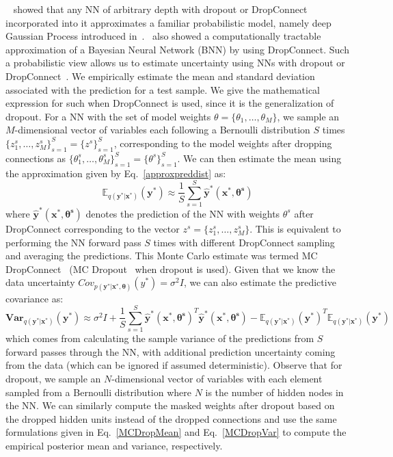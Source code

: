     ~\cite{DropoutUQ} showed that any NN of arbitrary depth with dropout or DropConnect incorporated into it approximates a familiar probabilistic model, namely deep Gaussian Process introduced in~\cite{DeepGP}.~\cite{DropConnectUQ} also showed a computationally tractable approximation of
    a Bayesian Neural Network (BNN) by using DropConnect. Such a probabilistic view allows us to estimate uncertainty using NNs with dropout or DropConnect~\cite{DropoutUQ, DropConnectUQ}. We empirically estimate the mean and standard deviation associated with the prediction for a test sample. We give the mathematical expression for such when DropConnect is used, since it is the generalization of dropout. For a NN with the set of model weights $\theta = \{\theta_1, \ldots, \theta_M\}$, we sample an $M$-dimensional vector of variables each following a Bernoulli distribution $S$ times $\{z^s_1, \ldots, z^s_M\}_{s=1}^S = \{z^s\}_{s=1}^S$, corresponding to the model weights after dropping connections as $\{\theta^s_1, \ldots, \theta^s_M\}_{s=1}^S = \{\theta^s\}_{s=1}^S$. We can then estimate the mean using the approximation given by Eq.~\ref{approxpreddist} as:
    \begin{equation}\label{MCDropMean}
        \mathbb{E}_{q(\mathbf{y^*|x^*})}(\mathbf{y^*}) \approx \frac{1}{S} \sum_{s=1}^S \mathbf{\hat{y}^*(x^*,\theta^s)}
    \end{equation}
    where $\mathbf{\hat{y}^*(x^*,\theta^s)}$ denotes the prediction of the NN with weights $\theta^s$ after DropConnect corresponding to the vector $z^s=\{z^s_1, \ldots, z^s_M\}$. This is equivalent to performing the NN forward pass $S$ times with different DropConnect sampling and averaging the predictions. This Monte Carlo estimate was termed MC DropConnect~\cite{DropConnectUQ} (MC Dropout~\cite{DropoutUQ} when dropout is used). Given that we know the data uncertainty $Cov_{p(\mathbf{y^*|x^*, \theta})}(y^*) = \sigma^2I$, we can also estimate the predictive covariance as:
    \begin{equation}\label{MCDropVar}
        \mathbf{Var}_{q(\mathbf{y^*|x^*})}(\mathbf{y^*}) \approx \sigma^2I + \frac{1}{S} \sum_{s=1}^S \mathbf{\hat{y}^*(x^*,\theta^s)}^T \mathbf{\hat{y}^*(x^*,\theta^s)} - \mathbb{E}_{q(\mathbf{y^*|x^*})}(\mathbf{y^*})^T \mathbb{E}_{q(\mathbf{y^*|x^*})}(\mathbf{y^*})
    \end{equation}
    which comes from calculating the sample variance of the predictions from $S$ forward passes through the NN, with additional prediction uncertainty coming from the data (which can be ignored if assumed deterministic). Observe that for dropout, we sample an $N$-dimensional vector of variables with each element sampled from a Bernoulli distribution where $N$ is the number of hidden nodes in the NN. We can similarly compute the masked weights after dropout based on the dropped hidden units instead of the dropped connections and use the same formulations given in Eq.~\ref{MCDropMean} and Eq.~\ref{MCDropVar} to compute the empirical posterior mean and variance, respectively.

